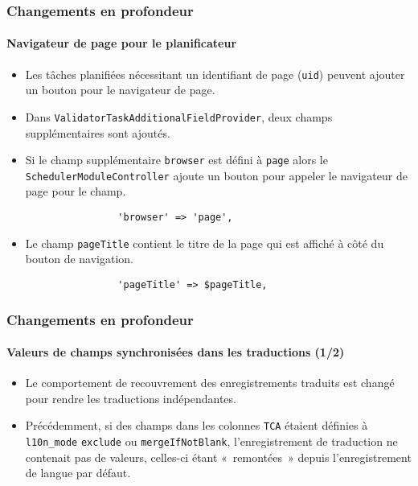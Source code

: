 \begin{frame}[fragile]
	\frametitle{Changements en profondeur}
	\framesubtitle{Navigateur de page pour le planificateur}

	\begin{itemize}
		\item Les tâches planifiées nécessitant un identifiant de page (\texttt{uid}) peuvent
			ajouter un bouton pour le navigateur de page.

		\item Dans \texttt{ValidatorTaskAdditionalFieldProvider}, deux champs supplémentaires
			sont ajoutés.

		\item Si le champ supplémentaire \texttt{browser} est défini à \texttt{page} alors le
			\texttt{SchedulerModuleController} ajoute un bouton pour appeler le navigateur de
			page pour le champ.

			\begin{lstlisting}
				'browser' => 'page',
			\end{lstlisting}

		\item Le champ \texttt{pageTitle} contient le titre de la page qui est affiché à côté
		 	du bouton de navigation.

			\begin{lstlisting}
				'pageTitle' => $pageTitle,
			\end{lstlisting}

	\end{itemize}

\end{frame}


\begin{frame}[fragile]
	\frametitle{Changements en profondeur}
	\framesubtitle{Valeurs de champs synchronisées dans les traductions (1/2)}

	\lstset{basicstyle=\tiny\ttfamily}

	\begin{itemize}
		\item Le comportement de recouvrement des enregistrements traduits est changé pour
			rendre les traductions indépendantes.

		\item Précédemment, si des champs dans les colonnes \texttt{TCA} étaient définies à
			\texttt{l10n\_mode} \texttt{exclude} ou \texttt{mergeIfNotBlank}, l'enregistrement
			de traduction ne contenait pas de valeurs, celles-ci étant «~remontées~» depuis
			l'enregistrement de langue par défaut.

	\end{itemize}

\end{frame}

